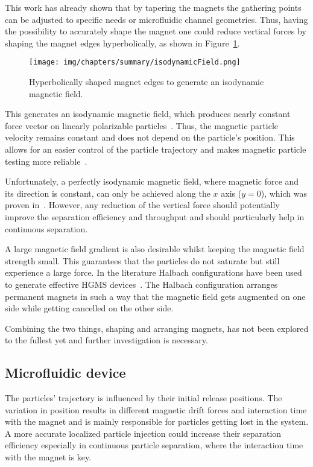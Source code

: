 This work has already shown that by tapering the magnets the gathering points can be adjusted to specific needs or microfluidic channel geometries. Thus, having the possibility to accurately shape the magnet one could reduce vertical forces by shaping the magnet edges hyperbolically, as shown in Figure~\ref{fig:isodynamicMagneticField}. 

\begin{figure}[htb]
\centering
\texttt{[image: img/chapters/summary/isodynamicField.png]}
\caption[Isodynamic magnetic field]{Hyperbolically shaped magnet edges to generate an isodynamic magnetic field.}
\label{fig:isodynamicMagneticField}
\end{figure}

This generates an isodynamic magnetic field, which produces nearly constant force vector on linearly polarizable particles~\cite{Zborowski2011,Hatch2001}. Thus, the magnetic particle velocity remains constant and does not depend on the particle's position. This allows for an easier control of the particle trajectory and makes magnetic particle testing more reliable~\cite{Moore2000}.

Unfortunately, a perfectly isodynamic magnetic field, where magnetic force and its direction is constant, can only be achieved along the $x$ axis ($y=0$), which was proven in~\cite{Gogosov1983,Smolkin2006}. However, any reduction of the vertical force should potentially improve the separation efficiency and throughput and should particularly help in continuous separation.

A large magnetic field gradient is also desirable whilst keeping the magnetic field strength small. This guarantees that the particles do not saturate but still experience a large force. In the literature Halbach configurations have been used to generate effective HGMS devices~\cite{Hatch2001}. The Halbach configuration arranges permanent magnets in such a way that the magnetic field gets augmented on one side while getting cancelled on the other side. 

Combining the two things, shaping and arranging magnets, has not been explored to the fullest yet and further investigation is necessary.

\subsection{Microfluidic device}
The particles' trajectory is influenced by their initial release positions. The variation in position results in different magnetic drift forces and interaction time with the magnet and is mainly responsible for particles getting lost in the system. A more accurate localized particle injection could increase their separation efficiency especially in continuous particle separation, where the interaction time with the magnet is key. 

